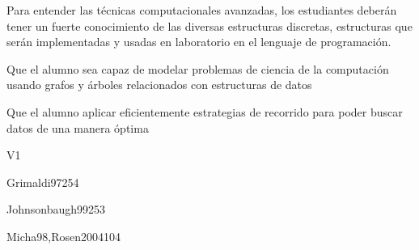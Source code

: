 \begin{syllabus}


\begin{justification}
Para entender las técnicas computacionales avanzadas, los estudiantes deberán tener un fuerte conocimiento de las
diversas estructuras discretas, estructuras que serán implementadas y usadas en laboratorio en el lenguaje de programación.
\end{justification}

\begin{goals}
\item Que el alumno sea capaz de modelar problemas de ciencia de la computación usando grafos y árboles relacionados con estructuras de datos
\item Que el alumno aplicar eficientemente estrategias de recorrido para poder buscar datos de una manera óptima
\end{goals}

\begin{outcomes}{V1}
\end{outcomes}

\begin{unit}{\DSBasicCountingDef}{}{Grimaldi97}{25}{4}
   \DSBasicCountingAllTopics
   \DSBasicCountingAllObjectives
\end{unit}

\begin{unit}{\DSGraphsAndTreesDef}{}{Johnsonbaugh99}{25}{3}
   \DSGraphsAndTreesAllTopics
   \DSGraphsAndTreesAllObjectives
\end{unit}

\begin{unit}{\DSDiscreteProbabilityDef}{}{Micha98,Rosen2004}{10}{4}
   \DSDiscreteProbabilityAllTopics
   \DSDiscreteProbabilityAllObjectives
\end{unit}

\begin{coursebibliography}
\end{coursebibliography}

\end{syllabus}

%
